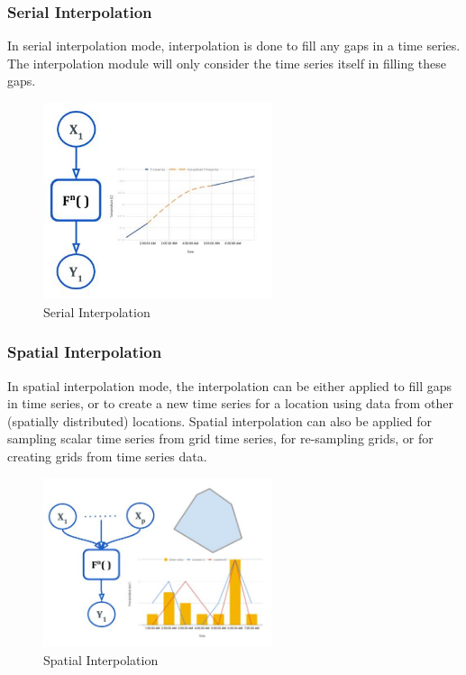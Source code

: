 \subsubsection{Serial Interpolation}
In serial interpolation mode, interpolation is done to fill any gaps in a time series. The interpolation module will only consider the time series itself in filling these gaps.
\begin{figure}[htp]
    \centering
    \includegraphics[width=0.6\textwidth]{method/data_preprocess/serial_interpolation.jpg}
    \caption{Serial Interpolation}
    \label{fi:serial_interpolation}
\end{figure}

\subsubsection{Spatial Interpolation}
In spatial interpolation mode, the interpolation can be either applied to fill gaps in time series, or to create a new time series for a location using data from other (spatially distributed) locations. Spatial interpolation can also be applied for sampling scalar time series from grid time series, for re-sampling grids, or for creating grids from time series data.
\begin{figure}[htp]
    \centering
    \includegraphics[width=0.6\textwidth]{method/data_preprocess/spatial_interpolation.jpg}
    \caption{Spatial Interpolation}
    \label{fi:spatial_interpolation}
\end{figure}

